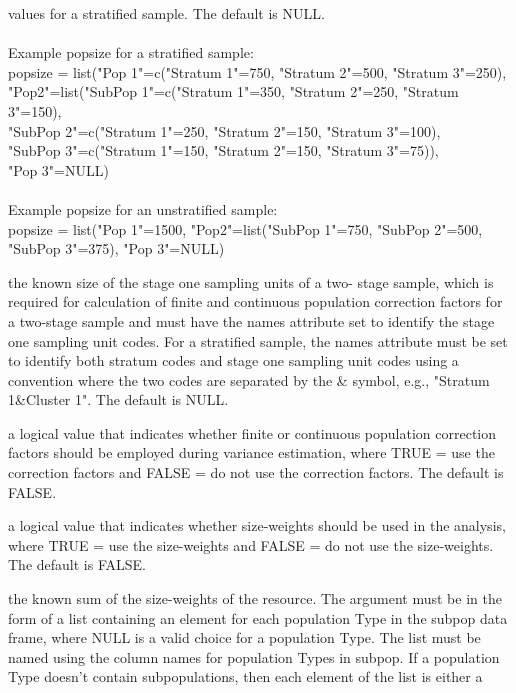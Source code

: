 \begin{Arguments}
\begin{ldescription}
values for a stratified sample.  The default is NULL.\\\\
Example popsize for a stratified sample:\\
popsize = list("Pop 1"=c("Stratum 1"=750, "Stratum 2"=500,
"Stratum 3"=250),\\ "Pop2"=list("SubPop 1"=c("Stratum 1"=350,
"Stratum 2"=250, "Stratum 3"=150),\\ "SubPop 2"=c("Stratum 1"=250,
"Stratum 2"=150, "Stratum 3"=100),\\ "SubPop 3"=c("Stratum 1"=150,
"Stratum 2"=150, "Stratum 3"=75)),\\ "Pop 3"=NULL)\\\\
Example popsize for an unstratified sample:\\
popsize = list("Pop 1"=1500, "Pop2"=list("SubPop 1"=750,
"SubPop 2"=500, "SubPop 3"=375), "Pop 3"=NULL)\\
\item[\code{stage1size}] the known size of the stage one sampling units of a two-
stage sample, which is required for calculation of finite and  
continuous population correction factors for a two-stage sample and 
must have the names attribute set to identify the stage one sampling 
unit codes.  For a stratified sample, the names attribute must be set
to identify both stratum codes and stage one sampling unit codes using
a convention where the two codes are separated by the \& symbol, e.g.,
"Stratum 1\&Cluster 1".  The default is NULL.
\item[\code{popcorrect}] a logical value that indicates whether finite or continuous 
population correction factors should be employed during variance 
estimation, where TRUE = use the correction factors and FALSE = do not 
use the correction factors.  The default is FALSE.
\item[\code{sizeweight}] a logical value that indicates whether size-weights should 
be used in the analysis, where TRUE = use the size-weights and FALSE = 
do not use the size-weights.  The default is FALSE.
\item[\code{unitsize}] the known sum of the size-weights of the resource.  The 
argument must be in the form of a list containing an element for each  
population Type in the subpop data frame, where NULL is a valid choice  
for a population Type.  The list must be named using the column  
names for population Types in subpop.  If a population Type doesn't  
contain subpopulations, then each element of the list is either a  

\end{ldescription}
\end{Arguments}
